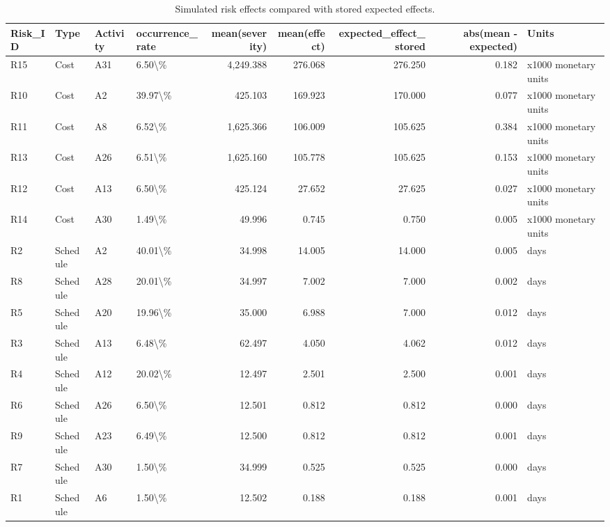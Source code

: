 \begin{table}
\caption{Simulated risk effects compared with stored expected effects.}
\label{tab:risk-effect-summary}
\begin{tabular}{llllrrrrl}
\toprule
Risk\_ID & Type & Activity & occurrence\_rate & mean(severity) & mean(effect) & expected\_effect\_stored & abs(mean - expected) & Units \\
\midrule
R15 & Cost & A31 & 6.50\textbackslash \% & 4,249.388 & 276.068 & 276.250 & 0.182 & x1000 monetary units \\
R10 & Cost & A2 & 39.97\textbackslash \% & 425.103 & 169.923 & 170.000 & 0.077 & x1000 monetary units \\
R11 & Cost & A8 & 6.52\textbackslash \% & 1,625.366 & 106.009 & 105.625 & 0.384 & x1000 monetary units \\
R13 & Cost & A26 & 6.51\textbackslash \% & 1,625.160 & 105.778 & 105.625 & 0.153 & x1000 monetary units \\
R12 & Cost & A13 & 6.50\textbackslash \% & 425.124 & 27.652 & 27.625 & 0.027 & x1000 monetary units \\
R14 & Cost & A30 & 1.49\textbackslash \% & 49.996 & 0.745 & 0.750 & 0.005 & x1000 monetary units \\
R2 & Schedule & A2 & 40.01\textbackslash \% & 34.998 & 14.005 & 14.000 & 0.005 & days \\
R8 & Schedule & A28 & 20.01\textbackslash \% & 34.997 & 7.002 & 7.000 & 0.002 & days \\
R5 & Schedule & A20 & 19.96\textbackslash \% & 35.000 & 6.988 & 7.000 & 0.012 & days \\
R3 & Schedule & A13 & 6.48\textbackslash \% & 62.497 & 4.050 & 4.062 & 0.012 & days \\
R4 & Schedule & A12 & 20.02\textbackslash \% & 12.497 & 2.501 & 2.500 & 0.001 & days \\
R6 & Schedule & A26 & 6.50\textbackslash \% & 12.501 & 0.812 & 0.812 & 0.000 & days \\
R9 & Schedule & A23 & 6.49\textbackslash \% & 12.500 & 0.812 & 0.812 & 0.001 & days \\
R7 & Schedule & A30 & 1.50\textbackslash \% & 34.999 & 0.525 & 0.525 & 0.000 & days \\
R1 & Schedule & A6 & 1.50\textbackslash \% & 12.502 & 0.188 & 0.188 & 0.001 & days \\
\bottomrule
\end{tabular}
\end{table}
